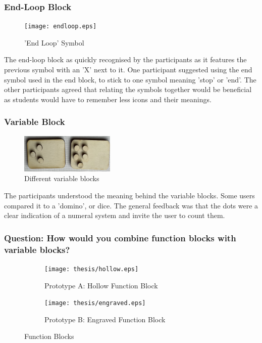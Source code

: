 \documentclass[oneside,%
                    author={Malak Hajji},
                    degree={BSc},
                    title={Designing An Accessible Ozobot Programming Platform for Students},
                  subtitle={With Mixed Visual Abilities}]{dissertation}
\begin{document}
\subsubsection{End-Loop Block}
\FloatBarrier
\begin{figure}[h]
    \centering
    \texttt{[image: endloop.eps]}
    \caption{'End Loop' Symbol}
    \label{fig-endloop}
\end{figure}
\FloatBarrier
The end-loop block as quickly recognised by the participants as it features the previous symbol with an 'X' next to it. One participant suggested using the end symbol used in the end block, to stick to one symbol meaning 'stop' or 'end'. The other participants agreed that relating the symbols together would be beneficial as students would have to remember less icons and their meanings.

\subsubsection{Variable Block}

\FloatBarrier
\begin{figure}[h]
    \centering
    \includegraphics[width=0.4\textwidth]{thesis/variables.eps}
    \caption{Different variable blocks}
    \label{fig-variable}
\end{figure}
\FloatBarrier

The participants understood the meaning behind the variable blocks. Some users compared it to a 'domino', or dice. The general feedback was that the dots were a clear indication of a numeral system and invite the user to count them.

\subsubsection{Question: How would you combine function blocks with variable blocks?}

\FloatBarrier

\begin{figure}[h]
\centering
\begin{subfigure}{.5\textwidth}
  \centering
  \texttt{[image: thesis/hollow.eps]}
  \caption{Prototype A: Hollow Function Block}
  \label{fig-hollow}
\end{subfigure}%
\begin{subfigure}{.5\textwidth}
  \centering
  \texttt{[image: thesis/engraved.eps]}
  \caption{Prototype B: Engraved Function Block} 
  \label{fig-engraved}
\end{subfigure}
\caption{Function Blocks}
\label{fig-function}
\end{figure}
\FloatBarrier
\end{document}
